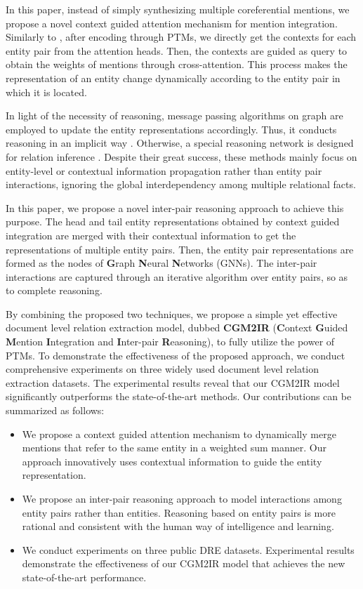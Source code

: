 \documentclass[11pt]{article}
\begin{document}
In this paper, instead of simply synthesizing multiple coreferential mentions, we propose a novel context guided attention mechanism for mention integration.
Similarly to \citet{DBLP:conf/aaai/Zhou0M021}, after encoding through PTMs, we directly get the contexts for each entity pair from the attention heads.
Then, the contexts are guided as query to obtain the weights of mentions through cross-attention.
This process makes the representation of an entity change dynamically according to the entity pair in which it is located.

In light of the necessity of reasoning, message passing algorithms on graph are employed to update the entity representations accordingly.
Thus, it conducts reasoning in an implicit way \cite{christopoulou-etal-2019-connecting}. 
Otherwise, a special reasoning network is designed for relation inference \cite{zeng-etal-2020-double,li-etal-2021-mrn}.
Despite their great success, these methods mainly focus on entity-level or contextual information propagation rather than entity pair interactions, ignoring the global interdependency among multiple relational facts.

In this paper, we propose a novel inter-pair reasoning approach to achieve this purpose.
The head and tail entity representations obtained by context guided integration are merged with their contextual information to get the representations of multiple entity pairs.
Then, the entity pair representations are formed as the nodes of \textbf{G}raph \textbf{N}eural \textbf{N}etworks (GNNs).
The inter-pair interactions are captured through an iterative algorithm over entity pairs, so as to complete reasoning. 

By combining the proposed two techniques, we propose a simple yet effective document level relation extraction model, dubbed \textbf{CGM2IR} (\textbf{C}ontext \textbf{G}uided \textbf{M}ention \textbf{I}ntegration and \textbf{I}nter-pair \textbf{R}easoning), to fully utilize the power of PTMs.
To demonstrate the effectiveness of the proposed approach, we conduct comprehensive experiments on three widely used document level relation extraction datasets. The experimental results reveal that our CGM2IR model significantly outperforms the state-of-the-art methods.
Our contributions can be summarized as follows:
\begin{itemize}
	\item We propose a context guided attention mechanism to dynamically merge mentions that refer to the same entity in a weighted sum manner.
	Our approach innovatively uses contextual information to guide the entity representation.
	\item We propose an inter-pair reasoning approach to model interactions among entity pairs rather than entities.
	Reasoning based on entity pairs is more rational and consistent with the human way of intelligence and learning.
	\item We conduct experiments on three public DRE datasets.
	Experimental results demonstrate the effectiveness of our CGM2IR model that achieves the new state-of-the-art performance. 
\end{itemize}
\end{document}
